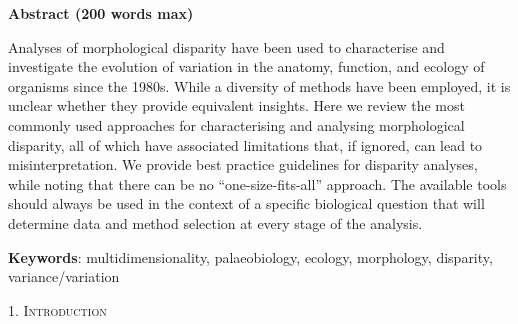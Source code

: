 \documentclass[12pt,letterpaper]{article}
\renewcommand{\section}[1]{%
\bigskip
\begin{center}
\begin{Large}
\normalfont\scshape #1
\medskip
\end{Large}
\end{center}}
\begin{document}
\textbf{Abstract (200 words max)}

Analyses of morphological disparity have been used to characterise and investigate the evolution of variation in the anatomy, function, and ecology of organisms since the 1980s.
While a diversity of methods have been employed, it is unclear whether they provide
equivalent insights.
Here we review the most commonly used approaches for characterising and analysing morphological disparity, all of which have associated limitations that, if ignored, can lead to misinterpretation.
We provide best practice guidelines for disparity analyses, while noting that there can be no ``one-size-fits-all'' approach.
The available tools should always be used in the context of a specific biological question that will determine data and method selection at every stage of the analysis.

\textbf{Keywords}: multidimensionality, palaeobiology, ecology,
morphology, disparity, variance/variation

\hypertarget{introduction}{%
\section{1. Introduction}\label{introduction}}
\end{document}
